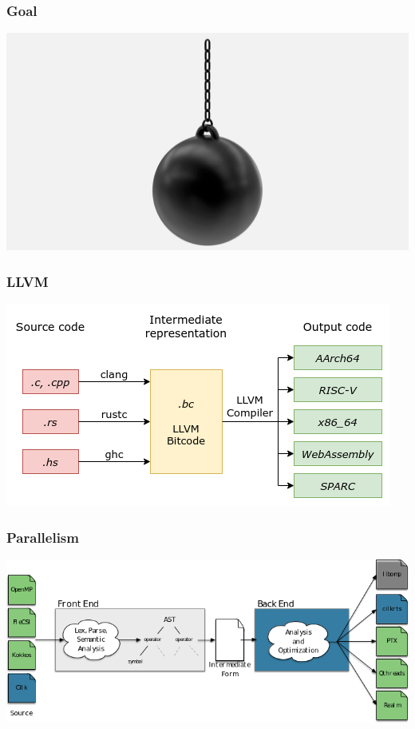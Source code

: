 \documentclass[usenames,dvipsnames]{beamer}
\begin{document}
\begin{frame}[fragile]
\frametitle{Goal}
\includegraphics[width=\textwidth]{wreckingball.jpg}
\end{frame}


\begin{frame}[fragile]
\frametitle{LLVM}
\center
\includegraphics[width=\textwidth]{llvm.png}
\end{frame}

\begin{frame}[fragile]
\frametitle{Parallelism}
\center
\includegraphics[width=\textwidth]{overview.png}
\end{frame}
\end{document}
